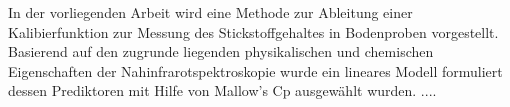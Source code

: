 In der vorliegenden Arbeit wird eine Methode zur Ableitung einer Kalibierfunktion zur Messung des Stickstoffgehaltes
in Bodenproben vorgestellt. Basierend auf den zugrunde liegenden physikalischen und chemischen Eigenschaften der Nahinfrarotspektroskopie wurde ein lineares Modell formuliert dessen Prediktoren mit Hilfe von Mallow's Cp ausgewählt wurden. ....